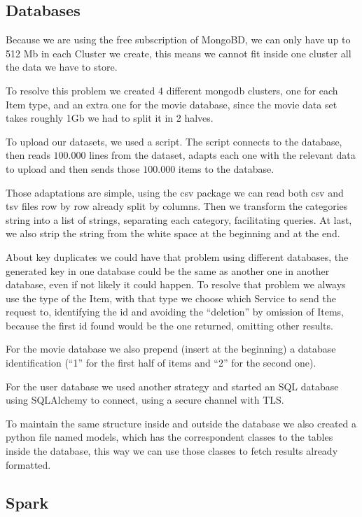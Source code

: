\documentclass[oneside]{article}
\newcommand*\fpar{\hspace{1ex}}
\begin{document}
    \subsection{Databases}
    \fpar Because we are using the free subscription of MongoBD, we can only have up to 512 Mb in each Cluster we create, this means we cannot fit inside one cluster all the data we have to store.
    \par To resolve this problem we created 4 different mongodb clusters, one for each Item type, and an extra one for the movie database, since the movie data set takes roughly 1Gb we had to split it in 2 halves.
    \par To upload our datasets, we used a script. The script connects to the database, then reads $100.000$ lines from the dataset, adapts each one with the relevant data to upload and then sends those $100.000$ items to the database. 
    \par Those adaptations are simple, using the csv package we can read both csv and tsv files row by row already split by columns. Then we transform the categories string into a list of strings, separating each category, facilitating queries. At last, we also strip the string from the white space at the beginning and at the end.
    \par About key duplicates we could have that problem using different databases, the generated key in one database could be the same as another one in another database, even if not likely it could happen. To resolve that problem we always use the type of the Item, with that type we choose which Service to send the request to, identifying the id and avoiding the “deletion” by omission of Items, because the first id found would be the one returned, omitting other results.
    \par For the movie database we also prepend (insert at the beginning) a database identification (“1” for the first half of items and “2” for the second one).
    \par For the user database we used another strategy and started an SQL database using SQLAlchemy to connect, using a secure channel with TLS.
    \par To maintain the same structure inside and outside the database we also created a python file named models, which has the correspondent classes to the tables inside the database, this way we can use those classes to fetch results already formatted. 

    \subsection{Spark}
\end{document}
